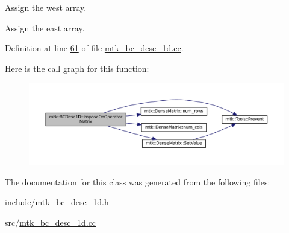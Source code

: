 \begin{DoxyEnumerate}
\item Assign the west array.
\item Assign the east array. 
\end{DoxyEnumerate}

Definition at line \hyperlink{mtk__bc__desc__1d_8cc_source_l00061}{61} of file \hyperlink{mtk__bc__desc__1d_8cc_source}{mtk\+\_\+bc\+\_\+desc\+\_\+1d.\+cc}.



Here is the call graph for this function\+:\nopagebreak
\begin{figure}[H]
\begin{center}
\leavevmode
\includegraphics[width=350pt]{classmtk_1_1BCDesc1D_a5e5dcda1780b9aa404e836c4c27ac08f_cgraph}
\end{center}
\end{figure}




The documentation for this class was generated from the following files\+:\begin{DoxyCompactItemize}
\item 
include/\hyperlink{mtk__bc__desc__1d_8h}{mtk\+\_\+bc\+\_\+desc\+\_\+1d.\+h}\item 
src/\hyperlink{mtk__bc__desc__1d_8cc}{mtk\+\_\+bc\+\_\+desc\+\_\+1d.\+cc}\end{DoxyCompactItemize}
